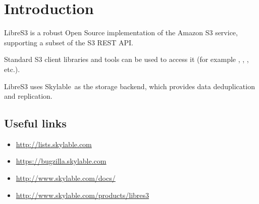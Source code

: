 \chapter{Introduction}
\indent LibreS3 is a robust Open Source implementation of the Amazon S3 service,
supporting a subset of the S3 REST API\@.

Standard S3 client libraries and tools can be used to access it (for example , , , etc.).

LibreS3 uses Skylable~\SX as the storage backend, which provides data
deduplication and replication.

\section{Useful links}
\begin{itemize}
    \item \url{http://lists.skylable.com}
    \item \url{https://bugzilla.skylable.com}
    \item \url{http://www.skylable.com/docs/}
    \item \url{http://www.skylable.com/products/libres3}
\end{itemize}
